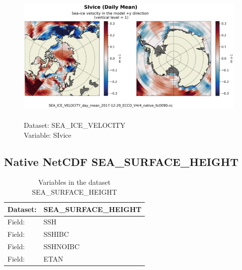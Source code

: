 \begin{figure}[H]
\centering
\includegraphics[scale=0.5]{../images/plots/native_plots/Sea-Ice_Velocity/SIvice.png}
\caption{\\Dataset: SEA\_ICE\_VELOCITY\\Variable: SIvice}
\label{tab:table-SEA_ICE_VELOCITY_SIvice-Plot}
\end{figure}
\pagebreak
\subsection{Native NetCDF SEA\_SURFACE\_HEIGHT}
\newp
\begin{longtable}{|p{}|p{}|}
\caption{Variables in the dataset SEA\_SURFACE\_HEIGHT}
\label{tab:table-SEA_SURFACE_HEIGHT-fields} \\ 
\hline \endhead \hline \endfoot
\rowcolor{lightgray} \textbf{Dataset:} & \textbf{SEA\_SURFACE\_HEIGHT} \\ \hline
Field: &SSH \\ \hline
Field: &SSHIBC \\ \hline
Field: &SSHNOIBC \\ \hline
Field: &ETAN \\ \hline
\end{longtable}

\pagebreak
